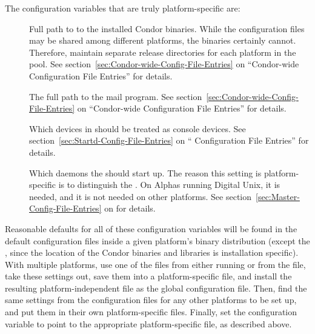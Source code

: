 The configuration variables that are truly platform-specific are:

\begin{description}

\item[] Full path to to the installed
  Condor binaries.  While the configuration files may be shared among
  different platforms, the binaries certainly cannot.  Therefore,
  maintain separate release directories for each platform
  in the pool.  See section~\ref{sec:Condor-wide-Config-File-Entries}
  on ``Condor-wide Configuration File Entries'' for details.

\item[] The full path to the mail program.  See
  section~\ref{sec:Condor-wide-Config-File-Entries} on ``Condor-wide
  Configuration File Entries'' for details.

\item[] Which devices in  should be
  treated as console devices.  See
  section~\ref{sec:Startd-Config-File-Entries} on ``
  Configuration File Entries'' for details.

\item[] Which daemons the  should
  start up.  The reason this setting is platform-specific is
  to distinguish the .
  On Alphas running Digital Unix, it is needed,
  and it is not needed on other platforms.
  See section~\ref{sec:Master-Config-File-Entries} on
  for details.

\end{description}

Reasonable defaults for all of these configuration variables
will be found in the
default configuration files inside a given platform's binary distribution
(except the , since 
the location of the Condor binaries and libraries is installation specific).
With multiple platforms,
use one of the  files from
either running  or from the
 file,
take these settings out,
save them into a platform-specific file,
and install the resulting platform-independent file as the global
configuration file.
Then,
find the same settings from the configuration files for any other platforms
to be set up, and put them in their own platform-specific files.
Finally, set the  configuration variable
to point to
the appropriate platform-specific file, as described above.

